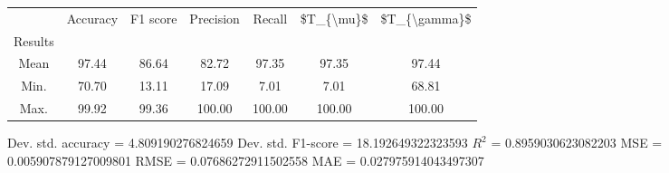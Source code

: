\begin{tabular}{|c|c|c|c|c|c|c|}
\toprule
{} &  Accuracy &  F1 score &  Precision &  Recall &  \$T\_\{\textbackslash mu\}\$ &  \$T\_\{\textbackslash gamma\}\$ \\
Results &           &           &            &         &            &               \\
\hline
Mean    &     97.44 &     86.64 &      82.72 &   97.35 &      97.35 &         97.44 \\
Min.    &     70.70 &     13.11 &      17.09 &    7.01 &       7.01 &         68.81 \\
Max.    &     99.92 &     99.36 &     100.00 &  100.00 &     100.00 &        100.00 \\
\bottomrule
\end{tabular}

 Dev. std. accuracy = 4.809190276824659
 Dev. std. F1-score = 18.192649322323593
 $R^2$ = 0.8959030623082203
 MSE = 0.005907879127009801
 RMSE = 0.07686272911502558
 MAE = 0.027975914043497307